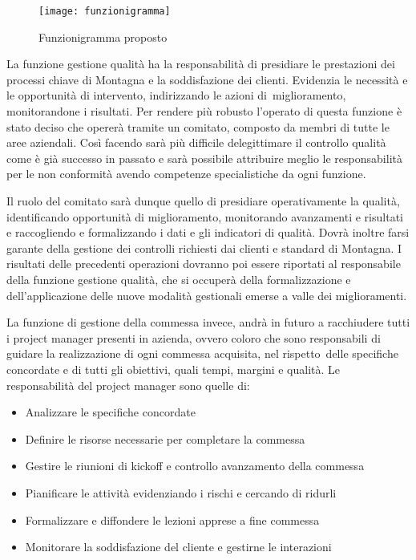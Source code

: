 \begin{figure}[H]
	\centering
	\texttt{[image: funzionigramma]}
	\caption{Funzionigramma proposto}
\end{figure}

\begin{multicols}{2}
	La funzione gestione qualità ha la responsabilità di presidiare le prestazioni dei processi chiave di Montagna e la soddisfazione dei clienti. Evidenzia le necessità e le opportunità di intervento, indirizzando le azioni di miglioramento, monitorandone i risultati. Per rendere più robusto l’operato di questa funzione è stato deciso che opererà tramite un comitato, composto da membri di tutte le aree aziendali. Così facendo sarà più difficile delegittimare il controllo qualità come è già successo in passato e sarà possibile attribuire meglio le responsabilità per le non conformità avendo competenze specialistiche da ogni funzione.

	Il ruolo del comitato sarà dunque quello di presidiare operativamente la qualità, identificando opportunità di miglioramento, monitorando avanzamenti e risultati e raccogliendo e formalizzando i dati e gli indicatori di qualità. Dovrà inoltre farsi garante della gestione dei controlli richiesti dai clienti e standard di Montagna. I risultati delle precedenti operazioni dovranno poi essere riportati al responsabile della funzione gestione qualità, che si occuperà della formalizzazione e dell’applicazione delle nuove modalità gestionali emerse a valle dei miglioramenti.

  La funzione di gestione della commessa invece, andrà in futuro a racchiudere tutti i project manager presenti in azienda, ovvero coloro che sono responsabili di guidare la realizzazione di ogni commessa acquisita, nel rispetto delle specifiche concordate e di tutti gli obiettivi, quali tempi, margini e qualità. Le responsabilità del project manager sono quelle di:
	\begin{itemize}
		\item Analizzare le specifiche concordate
		\item Definire le risorse necessarie per completare la commessa
		\item Gestire le riunioni di kickoff e controllo avanzamento della commessa
		\item Pianificare le attività evidenziando i rischi e cercando di ridurli
		\item Formalizzare e diffondere le lezioni apprese a fine commessa
		\item Monitorare la soddisfazione del cliente e gestirne le interazioni
	\end{itemize}


\end{multicols}
